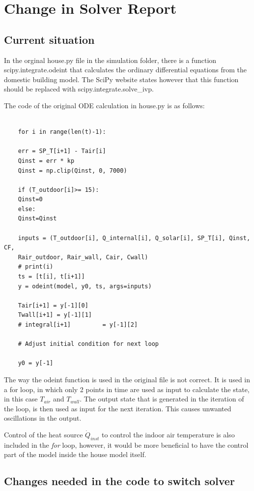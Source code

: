 \section{Change in Solver Report}

\subsection{Current situation}

In the orginal house.py file in the simulation folder, there is a function \textsf{scipy.integrate.odeint}  that calculates the ordinary differential equations from the domestic building model. The \textsf{SciPy} website states however that this function should be replaced with \textsf{scipy.integrate.solve\_ivp}. 

The code of the original ODE calculation in \textsf{house.py} is as follows:

\begin{lstlisting}
	
	for i in range(len(t)-1):
	
	err = SP_T[i+1] - Tair[i]
	Qinst = err * kp
	Qinst = np.clip(Qinst, 0, 7000)
	
	if (T_outdoor[i]>= 15):
	Qinst=0
	else:
	Qinst=Qinst
	
	inputs = (T_outdoor[i], Q_internal[i], Q_solar[i], SP_T[i], Qinst, CF,
	Rair_outdoor, Rair_wall, Cair, Cwall)
	# print(i)
	ts = [t[i], t[i+1]]
	y = odeint(model, y0, ts, args=inputs)
	
	Tair[i+1] = y[-1][0]
	Twall[i+1] = y[-1][1]
	# integral[i+1]         = y[-1][2]
	
	# Adjust initial condition for next loop
	
	y0 = y[-1]
\end{lstlisting}

The way the \textsf{odeint} function is used in the original file is not correct. It is used in a \textsf{for} loop, in which only 2 points in time are used as input to calculate the state, in this case $T_{air}$ and $T_{wall}$. The output state that is generated in the iteration of the loop, is then used as input for the next iteration. This causes unwanted oscillations in the output.

Control of the heat source $\dot{Q}_{inst}$ to control the indoor air temperature is also included in the \textit{for} loop, however, it would be more beneficial to have the control part of the model inside the house model itself.

\subsection{Changes needed in the code to switch solver}

